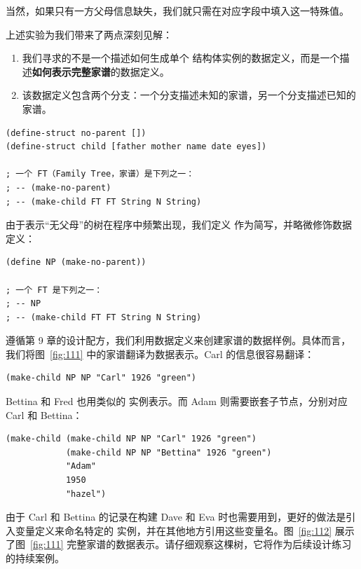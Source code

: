 当然，如果只有一方父母信息缺失，我们就只需在对应字段中填入这一特殊值。

上述实验为我们带来了两点深刻见解：
\begin{enumerate}
  \item 我们寻求的不是一个描述如何生成单个  结构体实例的数据定义，而是一个描述\textbf{如何表示完整家谱}的数据定义。
  \item 该数据定义包含两个分支：一个分支描述未知的家谱，另一个分支描述已知的家谱。
\end{enumerate}

\begin{lstlisting}[language=BSL]
(define-struct no-parent [])
(define-struct child [father mother name date eyes])

; 一个 FT（Family Tree，家谱）是下列之一：
; -- (make-no-parent)
; -- (make-child FT FT String N String)
\end{lstlisting}

由于表示“无父母”的树在程序中频繁出现，我们定义  作为简写，并略微修饰数据定义：

\begin{lstlisting}[language=BSL]
(define NP (make-no-parent))

; 一个 FT 是下列之一：
; -- NP
; -- (make-child FT FT String N String)
\end{lstlisting}

遵循第 9 章的设计配方，我们利用数据定义来创建家谱的数据样例。具体而言，我们将图~\ref{fig:111} 中的家谱翻译为数据表示。Carl 的信息很容易翻译：

\begin{lstlisting}[language=BSL]
(make-child NP NP "Carl" 1926 "green")
\end{lstlisting}

Bettina 和 Fred 也用类似的  实例表示。而 Adam 则需要嵌套子节点，分别对应 Carl 和 Bettina：

\begin{lstlisting}[language=BSL]
(make-child (make-child NP NP "Carl" 1926 "green")
            (make-child NP NP "Bettina" 1926 "green")
            "Adam"
            1950
            "hazel")
\end{lstlisting}

由于 Carl 和 Bettina 的记录在构建 Dave 和 Eva 时也需要用到，更好的做法是引入变量定义来命名特定的  实例，并在其他地方引用这些变量名。图~\ref{fig:112} 展示了图~\ref{fig:111} 完整家谱的数据表示。请仔细观察这棵树，它将作为后续设计练习的持续案例。

